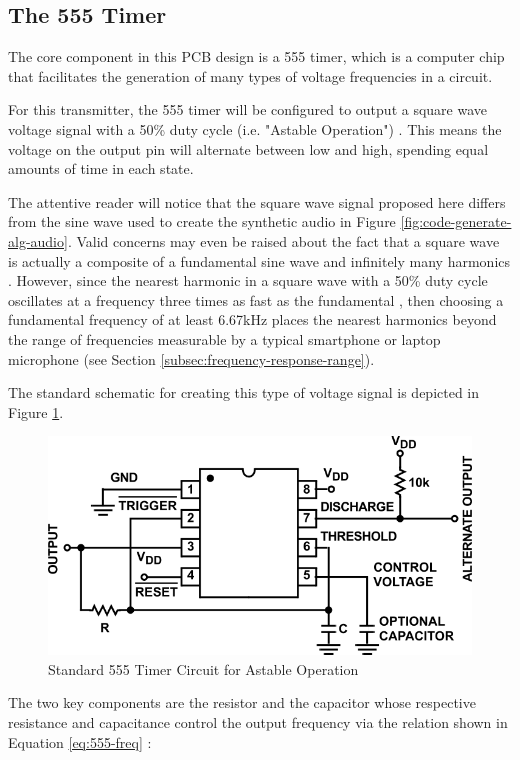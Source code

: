 \subsection{The 555 Timer}
\label{sec:the-555-timer}

The core component in this PCB design is a 555 timer, which is a
computer chip that facilitates the generation of many types of voltage
frequencies in a circuit.

For this transmitter, the 555 timer will be configured to output a
square wave voltage signal with a 50\% duty cycle (i.e. "Astable
Operation") \cite{icm7555}. This means the voltage on the output pin
will alternate between low and high, spending equal amounts of time in
each state.

The attentive reader will notice that the square wave signal proposed
here differs from the sine wave used to create the synthetic audio in
Figure \ref{fig:code-generate-alg-audio}. Valid concerns may even be
raised about the fact that a square wave is actually a composite of a
fundamental sine wave and infinitely many harmonics \cite{harmonics}.
However, since the nearest harmonic in a square wave with a 50\% duty
cycle oscillates at a frequency three times as fast as the fundamental
\cite{square-waves}, then choosing a fundamental frequency of at least
6.67kHz places the nearest harmonics beyond the range of frequencies
measurable by a typical smartphone or laptop microphone (see Section
\ref{subsec:frequency-response-range}).

The standard schematic for creating this type of voltage signal is
depicted in Figure \ref{fig:555_astable}.

\begin{figure}[h]
    \centering
    \caption{Standard 555 Timer Circuit for Astable Operation \cite{icm7555}}
    \label{fig:555_astable}
    \includegraphics[width=0.75\linewidth]{Figures/6 PCB Design/555_astable.png}
\end{figure}

The two key components are the resistor  and the capacitor
 whose respective resistance and capacitance control the output
frequency  via the relation shown in Equation \ref{eq:555-freq}
\cite{icm7555}:


